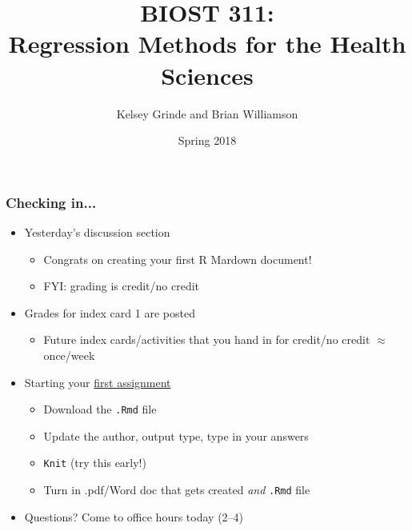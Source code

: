 \documentclass[12pt, 
hyperref={colorlinks=true, linkcolor=blue, urlcolor=cyan}]{beamer}
\title{BIOST 311: \\ Regression Methods for the Health Sciences}
\author{Kelsey Grinde and Brian Williamson}
\institute{UW Biostatistics}
\date{Spring 2018}
\begin{document}
\begin{frame}
\titlepage\thispagestyle{empty}
\end{frame}

\begin{frame}
\frametitle{Checking in...}
\begin{itemize}
\item Yesterday's discussion section %
	\begin{itemize}
	\item Congrats on creating your first R Mardown document!
	\item FYI: grading is credit/no credit
	\end{itemize}
\item Grades for index card 1 are posted %
	\begin{itemize}
	\item Future index cards/activities that you hand in for credit/no credit $\approx$ once/week
	\end{itemize}
\item Starting your \href{https://canvas.uw.edu/courses/1203588/assignments/4098142}{first assignment} %
	\begin{itemize}
	\item Download the \texttt{.Rmd} file
	\item Update the author, output type, type in your answers %
	\item \texttt{Knit} (try this early!) %
	\item Turn in .pdf/Word doc that gets created \textit{and} \texttt{.Rmd} file
	\end{itemize}
\item Questions? Come to office hours today (2--4) %
\end{itemize}
\end{frame}
\end{document}
